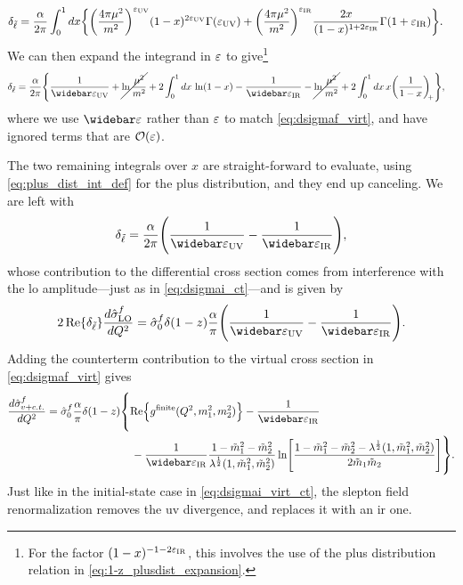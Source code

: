 \begin{align}
    \delta_{\tilde{\ell}} &= \frac{\alpha}{2\pi} \int_0^1 dx \biggl\{
        \biggl(\frac{4\pi\mu^2}{m^2}\biggr)^{\varepsilon_{\mathrm{UV}}} (1-x)^{2\varepsilon_{\mathrm{UV}}} \Gamma(\varepsilon_{\mathrm{UV}})
        + \biggl(\frac{4\pi\mu^2}{m^2}\biggr)^{\varepsilon_{\mathrm{IR}}} \frac{2x}{(1-x)^{1+2\varepsilon_{\mathrm{IR}}}} \Gamma(1+\varepsilon_{\mathrm{IR}})
    \biggr\}.
\end{align}
We can then expand the integrand in $\varepsilon$ to give\footnote{For the factor $(1-x)^{-1-2\varepsilon_{\mathrm{IR}}}$, this involves the use of the plus distribution relation in \cref{eq:1-z_plusdist_expansion}.}
\begin{equation}
\begin{split}
    \delta_\slepton &= \frac{\alpha}{2\pi} \Biggl\{
        \frac{1}{\barepsUV} + \cancel{\ln\frac{\mu^2}{m^2}} + 2 \int_0^1 dx \, \ln(1-x)
        -\frac{1}{\barepsIR} - \cancel{\ln\frac{\mu^2}{m^2}} + 2 \int_0^1 dx\, x \biggl(\frac{1}{1-x}\biggr)_{\!\!+}
    \Biggr\},
\end{split}
\end{equation}
where we use $\widebar\eps$ rather than $\varepsilon$ to match \cref{eq:dsigmaf_virt}, and have ignored terms that are $\mathcal{O}(\varepsilon)$.

The two remaining integrals over $x$ are straight-forward to evaluate, using \cref{eq:plus_dist_int_def} for the plus distribution, and they end up canceling.
We are left with
\begin{equation}
    \delta_\slepton = \frac{\alpha}{2\pi} \Biggl( \frac{1}{\barepsUV} - \frac{1}{\barepsIR} \Biggr),
\end{equation}
whose contribution to the differential cross section comes from interference with the \gls{lo} amplitude---just as in \cref{eq:dsigmai_ct}---and is given by
\begin{equation}
    2\Re\{\delta_\slepton\} \frac{d\hat\sigma^f_{\mathrm{LO}}}{dQ^2}
    = \hat\sigma^f_0 \delta(1-z) \frac{\alpha}{\pi}
    \Biggl( \frac{1}{\barepsUV} - \frac{1}{\barepsIR} \Biggr).
\end{equation}
Adding the counterterm contribution to the virtual cross section in \cref{eq:dsigmaf_virt} gives
\begin{equation}
\begin{split}
    \frac{d\hat\sigma^f_{v+c.t.}}{dQ^2} =
    \hat\sigma^f_0 \frac{\alpha}{\pi} \delta(1-z)
    &\vastl\{
        \Re\Bigl\{ g^{\mathrm{finite}}(Q^2,m_1^2,m_2^2) \Bigr\}
        -\frac{1}{\barepsIR}
        \\ &\quad
        - \frac{1}{\barepsIR} \frac{1-\mt_1^2-\mt_2^2}{\lambda^{\frac{1}{2}}(1,\mt_1^2,\mt_2^2)} \ln\Biggl[
            \frac{1-\mt_1^2-\mt_2^2-\lambda^{\frac{1}{2}}(1,\mt_1^2,\mt_2^2)}{2\mt_1\mt_2}
        \Biggr]
    \vastr\}.
\end{split}
\label{eq:dsigmaf_virt_ct_dim}
\end{equation}
Just like in the initial-state case in \cref{eq:dsigmai_virt_ct}, the slepton field renormalization removes the \gls{uv} divergence, and replaces it with an \gls{ir} one.


